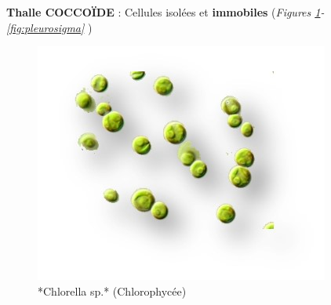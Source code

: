 \documentclass[
]{book}
\begin{document}
\textbf{Thalle COCCOÏDE} : Cellules isolées et \textbf{immobiles} (\emph{Figures \ref{fig:chlorella}-\ref{fig:pleurosigma} })

\begin{figure}[H]

{\centering \includegraphics[width=0.7\linewidth]{./images/chlorellasp} 

}

\caption{*Chlorella sp.* (Chlorophycée)}\label{fig:chlorella}
\end{figure}
\end{document}
